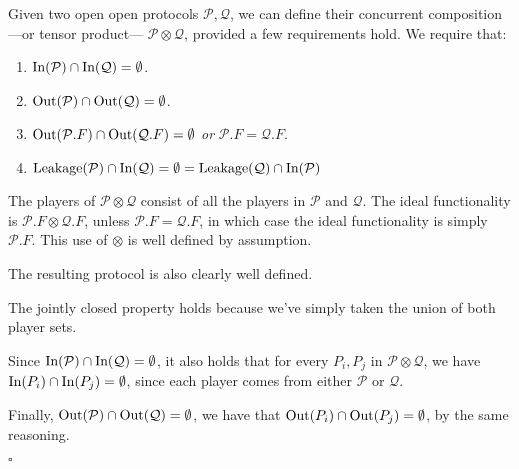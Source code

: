 \begin{definition}
Given two open open protocols $\mathcal{P}, \mathcal{Q}$,
we can define their concurrent composition---or tensor product---
$\mathcal{P} \otimes \mathcal{Q}$, provided a few requirements hold.
We require that:
\begin{enumerate}
\item $\text{In}(\mathcal{P}) \cap \text{In}(\mathcal{Q}) = \emptyset$.
\item $\text{Out}(\mathcal{P}) \cap \text{Out}(\mathcal{Q}) = \emptyset$.
\item $\text{Out}(\mathcal{P}.F) \cap \text{Out}(\mathcal{Q}.F) = \emptyset$ \emph{or} $\mathcal{P}.F = \mathcal{Q}.F$.
\item $\text{Leakage}(\mathcal{P}) \cap \text{In}(\mathcal{Q}) = \emptyset = \text{Leakage}(\mathcal{Q}) \cap \text{In}(\mathcal{P})$
\end{enumerate}

The players of $\mathcal{P} \otimes \mathcal{Q}$ consist of all the players
in $\mathcal{P}$ and $\mathcal{Q}$.
The ideal functionality is $\mathcal{P}.F \otimes \mathcal{Q}.F$, 
unless $\mathcal{P}.F = \mathcal{Q}.F$, in which case the ideal functionality
is simply $\mathcal{P}.F$.
This use of $\otimes$ is well defined by assumption.

The resulting protocol is also clearly well defined.

The jointly closed property holds because we've simply taken the union
of both player sets.

Since $\text{In}(\mathcal{P}) \cap \text{In}(\mathcal{Q}) = \emptyset$,
it also holds that for every $P_i, P_j$ in $\mathcal{P} \otimes \mathcal{Q}$,
we have $\text{In}(P_i) \cap \text{In}(P_j) = \emptyset$,
since each player comes from either $\mathcal{P}$ or $\mathcal{Q}$.
      
Finally, $\text{Out}(\mathcal{P}) \cap \text{Out}(\mathcal{Q}) = \emptyset$,
we have that $\text{Out}(P_i) \cap \text{Out}(P_j) = \emptyset$,
by the same reasoning.
    
$\square$
\end{definition}


